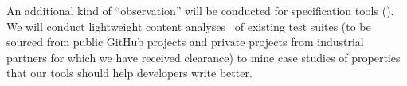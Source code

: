 

An additional kind of ``observation'' will be conducted for specification tools
(). We will conduct lightweight content
analyses~\cite{ref:krippendorff2018content} of existing test suites (to be
sourced from public GitHub projects and private projects from industrial
partners for which we have received clearance) to mine case studies of
properties that our tools should help developers write better.


